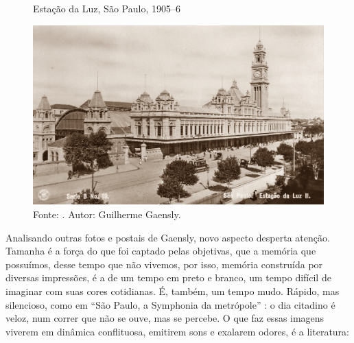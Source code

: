 \begin{refsection}
    \begin{figure}[ht]%
        \centering%
        \caption{Estação da Luz, São Paulo, 1905--6}%
        \includegraphics[width=.85\textwidth]{articles/15-cidade-em-mapas-text/estacao-luz.jpeg}%
        \caption*{Fonte: \textcite[p.~80--81]{KossoyFernandesJuniorAndSegawa2011Guilherme}. Autor: Guilherme Gaensly.}%
        \label{fig:estacao-luz}%
    \end{figure}%

    Analisando outras fotos e postais de Gaensly, novo aspecto desperta atenção. Tamanha é a força do que foi captado pelas objetivas, que a memória que possuímos, desse tempo que não vivemos, por isso, memória construída por diversas impressões, é a de um tempo em preto e branco, um tempo difícil de imaginar com suas cores cotidianas. É, também, um tempo mudo. Rápido, mas silencioso, como em ``São Paulo, a Symphonia da metrópole'' \citeyear{KemenyAndRex1929Sao}: o dia citadino é veloz, num correr que não se ouve, mas se percebe. O que faz essas imagens viverem em dinâmica conflituosa, emitirem sons e exalarem odores, é a literatura:


\end{refsection}
